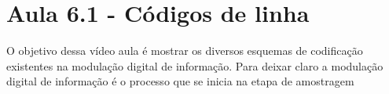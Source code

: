 \section{Aula 6.1 - Códigos de linha}

O objetivo dessa vídeo aula é mostrar os diversos esquemas de codificação existentes na modulação digital de informação.
Para deixar claro a modulação digital de informação é o processo que se inicia na etapa de amostragem
